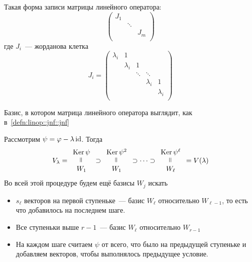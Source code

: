 \documentclass[12pt]{../../../notes}
\begin{document}
\begin{defn}[ЖНФ]\label{defn:linop::jnf::jnf}
  Такая форма записи матрицы линейного оператора:
  \[
    \begin{pmatrix}
      J_1 &        & ~ \\
      ~   & \ddots & ~ \\
      ~   & ~ & J_m \\
    \end{pmatrix}
  \]
  где $J_i$~--- жорданова клетка
  \[
    J_i = 
    \begin{pmatrix}
      \lambda_i & 1   & ~ & ~   & ~  \\
      ~   & \lambda_i & 1 & ~   & ~  \\
      ~   & ~   & \ddots & \ddots   & ~  \\
      ~   & ~   & ~ & \lambda_i & 1  \\
      ~   & ~   & ~ & ~   & \lambda_i \\
    \end{pmatrix}
  \]
\end{defn}
\begin{defn}\label{defn:linop::jnf::jbasis}
  Базис, в котором матрица линейного оператора выглядит, как в~\ref{defn:linop::jnf::jnf}
\end{defn}


Рассмотрим $\psi = \varphi - \lambda \operatorname{id}$.
\newcommand{\eqrot}{\rotatebox{90}{=}}
Тогда 
\[
  V_\lambda = \begin{array}{c}
    \Ker \psi\\
    \eqrot \\
    W_1
\end{array} \supset 
  \begin{array}{c}
    \Ker \psi^2\\
    \eqrot \\
    W_1
\end{array} \supset \dotsb \supset
  \begin{array}{c}
    \Ker \psi^{\ell}\\
    \eqrot \\
    W_\ell
  \end{array} = V(\lambda)
\]
Во всей этой процедуре будем ещё базисы $W_j$ искать

\begin{itemize}
  \item $s_\ell$ векторов на первой ступеньке~--- базис $W_\ell$ относительно $W_{\ell-1}$, то есть что добавилось на последнем
    шаге. 
  \item Все ступеньки выше $r-1$~--- базис $W_\ell$ относительно $W_{r-1}$
  \item На каждом шаге считаем $\psi$ от всего, что было на предыдущей ступеньке и добавляем векторов, 
    чтобы выполнялось предыдущее условие.
\end{itemize}
\end{document}
